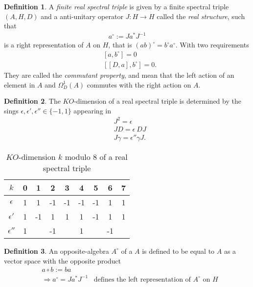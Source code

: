 \documentclass[a4paper]{article}
\theoremstyle{definition}
\newtheorem{definition}{Definition}
\theoremstyle{definition}
\theoremstyle{definition}
\theoremstyle{theorem}
\theoremstyle{theorem}
\begin{document}
\begin{definition}
    A \textit{finite real spectral triple} is given by a finite spectral
    triple $(A, H, D)$ and a anti-unitary operator $J:H\rightarrow H$ called
    the \textit{real structure}, such that
    \begin{align}
        a^\circ := J a^* J^{-1}
    \end{align}
    is a right representation of $A$ on $H$, that is $(ab)^\circ = b^\circ
    a^\circ$. With two requirements
    \begin{align}
        &[a, b^\circ] = 0\\
        &[[D, a],b^\circ] = 0.
    \end{align}
    They are called the \textit{commutant property}, and mean that the left
    action of an element in $A$ and $\Omega _D^1(A)$ commutes with the right
    action on $A$.
\end{definition}
\begin{definition}
    The $KO$-dimension of a real spectral triple is determined by the sings
    $\epsilon, \epsilon ' ,\epsilon '' \in \{-1, 1\}$ appearing in
    \begin{align}
        &J^2 = \epsilon \\
        &JD = \epsilon \ DJ\\
        &J\gamma = \epsilon '' \gamma J.
    \end{align}
\end{definition}
\begin{table}[h!]
    \centering
    \caption{$KO$-dimension $k$ modulo $8$ of a real spectral triple}
    \begin{tabular}{ c | c c c c c c c c}
        \hline
        $k$        & 0 & 1 & 2 & 3 & 4 & 5 & 6 & 7 \\
        \hline
     $\epsilon$    & 1 & 1 & -1 & -1 & -1 & -1 & 1 & 1 \\
     $\epsilon '$  & 1 & -1 & 1 & 1 & 1 & -1 & 1 & 1 \\
     $\epsilon ''$ & 1 &  & -1 &  & 1 &  & -1 &  \\
     \hline
    \end{tabular}
\end{table}


\begin{definition}
An opposite-algebra $A^\circ$ of a $A$ is defined to be equal to $A$ as a
vector space with the opposite product
\begin{align}
    &a\circ b := ba\\
    &\Rightarrow a^\circ = Ja^* J^{-1} \;\;\; \text{defines the left
    representation of $A^\circ$ on $H$}
\end{align}
\end{definition}
\end{document}
